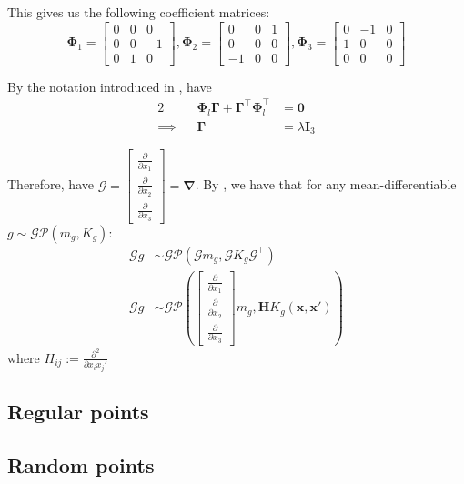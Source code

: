 \documentclass[12pt,a4paper,twoside]{report}
\theoremstyle{definition}
\begin{document}
This gives us the following coefficient matrices:
$$\boldsymbol \Phi_1 = \begin{bmatrix}  0&0&0\\0&0&-1\\0&1&0 \end{bmatrix} , \boldsymbol \Phi_2 = \begin{bmatrix} 0&0&1\\0&0&0\\-1&0&0 \end{bmatrix}, \boldsymbol \Phi_3 = \begin{bmatrix} 0&-1&0\\1&0&0\\0&0&0 \end{bmatrix}$$

By the notation introduced in , have 
\begin{alignat*}{2}
	\quad&&\boldsymbol \Phi_l\boldsymbol \Gamma + \boldsymbol \Gamma ^\top \boldsymbol \Phi_l^\top&=\mathbf 0\\
	\implies&&\boldsymbol \Gamma &= \lambda \mathbf I_3
\end{alignat*}

Therefore, have $\mathscr G = \begin{bmatrix} \frac{\partial}{\partial x_1} \\ \frac{\partial}{\partial x_2}\\\frac{\partial}{\partial x_3}\end{bmatrix} = \boldsymbol\nabla$. By , we have that for any mean-differentiable $g\sim \mathcal {GP}(m_g, K_g)$:
\begin{align*}
	\mathscr G g &\sim \mathcal {GP}\left( \mathscr G m_g, \mathscr G K_g \mathscr G^\top \right)\\
	\mathscr G g &\sim \mathcal {GP}\left( 
\begin{bmatrix} \frac{\partial}{\partial x_1} \\ \frac{\partial}{\partial x_2}\\\frac{\partial}{\partial x_3}\end{bmatrix} m_g,
		\mathbf H K_g(\mathbf x,\mathbf x') 
\right)
\end{align*}
where $H_{ij}:=\frac{\partial^2}{\partial x_ix_j'}$

\subsection{Regular points}

\subsection{Random points}
\end{document}
